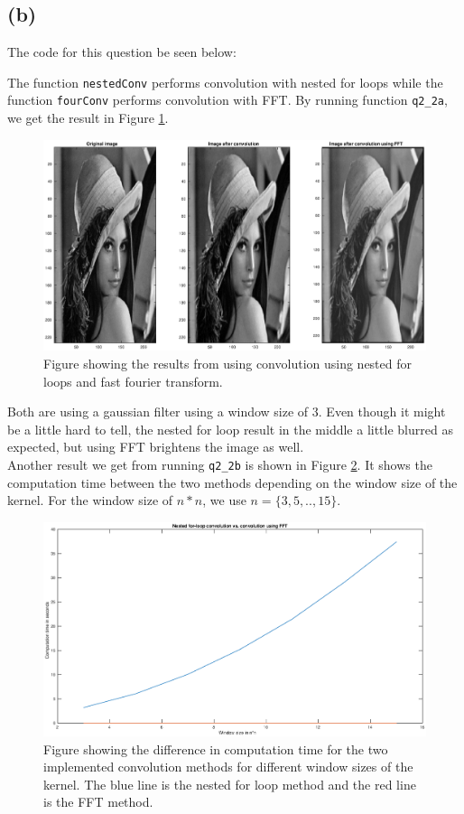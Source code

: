 \documentclass[a4paper]{article}
\begin{document}
\subsection{(b)}
The code for this question be seen below:

The function \texttt{nestedConv} performs convolution with nested for loops while the function \texttt{fourConv} performs convolution with FFT. By running function \texttt{q2\_2a}, we get the result in Figure \ref{fig2_2a}.
\begin{figure}[H]
  \centering
  \captionsetup{justification=centering}
  \includegraphics[width=\textwidth]{fig2_1.eps}
  \caption{Figure showing the results from using convolution using nested for loops and fast fourier transform.}
  \label{fig2_2a}
\end{figure}
Both are using a gaussian filter using a window size of $3$. Even though it might be a little hard to tell, the nested for loop result in the middle a little blurred as expected, but using FFT brightens the image as well. \\
Another result we get from running \texttt{q2\_2b} is shown in Figure \ref{fig2_2b}. It shows the computation time between the two methods depending on the window size of the kernel. For the window size of $n*n$, we use $n=\{3,5,..,15\}$.
\begin{figure}[H]
  \centering
  \captionsetup{justification=centering}
  \includegraphics[width=\textwidth]{fig2_2.eps}
  \caption{Figure showing the difference in computation time for the two implemented convolution methods for different window sizes of the kernel. The blue line is the nested for loop method and the red line is the FFT method.}
  \label{fig2_2b}
\end{figure}
\end{document}
